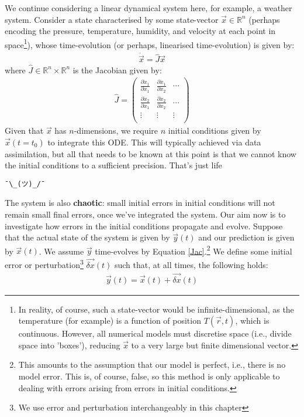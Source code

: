 We continue considering a linear dynamical system here, for example, a weather system. Consider a state characterised by some state-vector $\vec{x}\in\mathbb{R}^n$ (perhaps encoding the pressure, temperature, humidity, and velocity at each point in space\footnote{In reality, of course, such a state-vector would be infinite-dimensional, as the temperature (for example) is a function of position $T(\vec{r},t)$, which is continuous. However, all numerical models must discretise space (i.e., divide space into 'boxes'), reducing $\vec{x}$ to a very large but finite dimensional vector.}), whose time-evolution (or perhaps, linearised time-evolution) is given by:
\begin{align}\label{Jac}
    \dot{\vec{x}} = \hat{J}\vec{x}
\end{align}
where $\hat{J}\in\mathbb{R}^n\times\mathbb{R}^n$ is the Jacobian given by:
\begin{align}
    {\hat{J}}  =  \left( \begin{array}{ccc}
    \frac{\partial \dot{x}_1}{\partial x_1} & \frac{\partial \dot{x}_1}{\partial x_2} & \cdots \\
    \frac{\partial \dot{x}_2}{\partial x_1} & \frac{\partial \dot{x}_2}{\partial x_2} & \cdots \\
    \vdots & \vdots & \vdots \\
    \end{array} \right)
\end{align} 
Given that $\vec{x}$ has $n$-dimensions, we require $n$ initial conditions given by $\vec{x}(t=t_0)$ to integrate this ODE. This will typically achieved via data assimilation, but all that needs to be known at this point is that we cannot know the initial conditions to a sufficient precision. That's just life \begin{CJK}{UTF8}{min}\texttt{¯\textbackslash\_(ツ)\_/¯}\end{CJK}

The system is also \textbf{chaotic}: small initial errors in initial conditions will not remain small final errors, once we've integrated the system. Our aim now is to investigate how errors in the initial conditions propagate and evolve. Suppose that the actual state of the system is given by $\vec{y}(t)$ and our prediction is given by $\vec{x}(t)$. We assume $\vec{y}$ time-evolves by Equation \ref{Jac}.\footnote{This amounts to the assumption that our model is perfect, i.e., there is no model error. This is, of course, false, so this method is only applicable to dealing with errors arising from errors in initial conditions.} We define some initial error or perturbation\footnote{We use error and perturbation interchangeably in this chapter} $\vec{\delta x}(t)$ such that, at all times, the following holds:
\begin{align}
    \vec{y}(t)=\vec{x}(t)+\vec{\delta x}(t)
\end{align}

